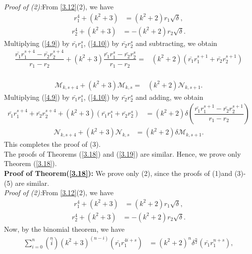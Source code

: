 \textit{Proof of (2):}From \ref{3.12}(2), we have
\begin{align}
r_1^{4}+(k^2+3)&=(k^2+2)r_1\sqrt{\delta},\label{4.9}
\end{align}
\begin{align}
r_2^{4}+(k^2+3)&=-(k^2+2)r_2\sqrt{\delta}.\label{4.10}
\end{align}
Multiplying (\ref{4.9}) by $\bar{r_{1}}r_1^s$, (\ref{4.10}) by $\bar{r_{2}}r_2^s$ and subtracting, we obtain 
\begin{align*}
\dfrac{\bar{r_{1}}r_1^{s+4}-\bar{r_{2}}r_2^{s+4}}{r_1-r_2}+(k^2+3)\dfrac{\bar{r_{1}}r_1^{s}-\bar{r_{2}}r_2^{s}}{r_1-r_2}=&(k^2+2)(\bar{r_{1}}r_1^{s+1}+\bar{r_{2}}r_2^{s+1})
\end{align*}
\\
\begin{align*}
\mathcal{M}_{k,s+4}+(k^2+3)\mathcal{M}_{k,s}=&(k^2+2)\mathcal{N}_{k,s+1}.
\end{align*}
Multiplying (\ref{4.9}) by $\bar{r_{1}}r_1^s$, (\ref{4.10}) by $\bar{r_{2}}r_2^s$ and adding, we obtain
\begin{align*}
\bar{r_{1}}r_1^{s+4}+\bar{r_{2}}r_2^{s+4}+(k^2+3)(\bar{r_{1}}r_1^{s}+\bar{r_{2}}r_2^{s})&=(k^2+2)\delta(\dfrac{\bar{r_{1}}r_1^{s+1}-\bar{r_{2}}r_2^{s+1}}{r_1-r_2})
\end{align*}
\begin{align*}
\mathcal{N}_{k,s+4}+(k^2+3)\mathcal{N}_{k,s}&=(k^2+2)\delta\mathcal{M}_{k,s+1}.
\end{align*}
This completes the proof of (3).\\
The proofs of Theorems (\ref{3.18}) and (\ref{3.19}) are similar. Hence, we prove only Theorem (\ref{3.18}).\\
\textbf{Proof of Theorem(\ref{3.18}):} We prove only (2), since the proofs of (1)and (3)-(5) are similar.\\
\textit{Proof of (2):}From \ref{3.12}(2), we have
\begin{align*}
r_1^{4}+(k^2+3)&=(k^2+2)r_1\sqrt{\delta},
\end{align*}
\begin{align*}
r_2^{4}+(k^2+3)&=-(k^2+2)r_2\sqrt{\delta}.
\end{align*}
Now, by the binomial theorem, we have
\begin{align}\label{4.11}
\sum\limits_{i=0}^{n}\left( \stackrel{n}{i}\right)(k^2+3)^{(n-i)}(\bar{r_{1}}r_1^{4i+s})&=(k^2+2)^n\delta^{\frac{n}{2}}(\bar{r_{1}}r_1^{n+s}), 
\end{align}

